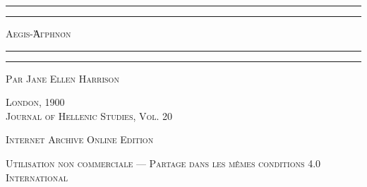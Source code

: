 \documentclass[a4paper, 11pt, oneside, polutonikogreek, french]{article}
\begin{document}
\begin{titlepage} %
	\centering %

	
	\rule{\textwidth}{1.6pt}\vspace*{-\baselineskip}\vspace*{2pt} %
	\rule{\textwidth}{0.4pt} %
	
	\vspace{1\baselineskip} %
	
	{\scshape \LARGE Aegis-Ἀγρηνόν}
	
	\vspace{1\baselineskip} %

	\rule{\textwidth}{0.4pt}\vspace*{-\baselineskip}\vspace{3.2pt} %
	\rule{\textwidth}{1.6pt} %
	
	\vspace{1\baselineskip} %
	

 	\vspace*{1\baselineskip} %

	{\scshape \Large Par Jane Ellen Harrison} %

 	\vspace*{1\baselineskip} %

        \vspace*{\fill}

	\vspace{1\baselineskip}

	{\scshape London, 1900 \\Journal of Hellenic Studies, Vol. 20}
		
	\vspace{0.5\baselineskip} %

        \scshape Internet Archive Online Edition%
	
	{\scshape\small Utilisation non commerciale --- Partage dans les mêmes conditions 4.0 International} %
\end{titlepage}
\setlength{\parskip}{1mm plus1mm minus1mm}
\clearpage
\end{document}
